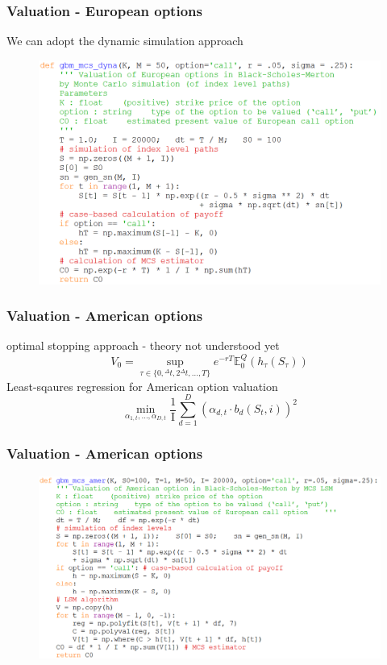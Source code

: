 \documentclass{beamer}
\begin{document}
\begin{frame}
\frametitle{Valuation - European options}
\begin{center}
We can adopt the dynamic simulation approach
\begin{figure}[H]
	\includegraphics[scale=0.41]{european_option_mcs_dynamic.png}
\end{figure}
\end{center}
\end{frame}

\begin{frame}
\frametitle{Valuation - American options}
\begin{center}
optimal stopping approach - theory not understood yet
$$V_{0} = \sup_{\tau \in \{ 0, {^{\Delta}t}, 2{^{\Delta}t}, \dots, T \}} e^{-rT} \mathbb{E}_{0}^{Q}(h_{\tau}(S_{\tau}))$$
Least-sqaures regression for American option valuation
$$ \min_{\alpha_{1,t}, \dots, \alpha_{D,t}} \frac{1}{\mathrm{I}} \sum_{d=1}^{D} (\alpha_{d,t}\cdot b_{d}(S_{t}, i))^{2} $$
\end{center}
\end{frame}

\begin{frame}
\frametitle{Valuation - American options}
\begin{figure}[H]
	\includegraphics[scale=0.4]{gbm_mcs_amer.png}
\end{figure}
\end{frame}
\end{document}

